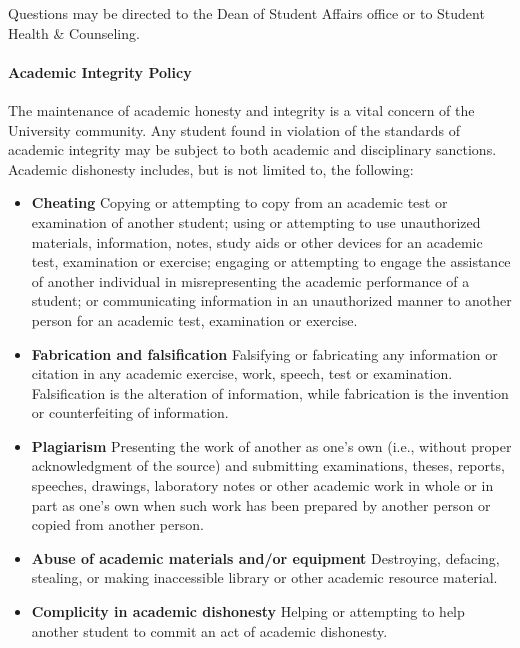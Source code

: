 \documentclass[12pt]{article}
\newcounter{ex}\setcounter{ex}{0}
\begin{document}
Questions may be directed to the Dean of Student Affairs office or to Student 
Health \& Counseling.


\paragraph{Academic Integrity Policy}

The maintenance of academic honesty and integrity is a vital concern 
of the University community. Any student found in violation of the 
standards of academic integrity may be subject to both academic and 
disciplinary sanctions. Academic dishonesty includes, but is not 
limited to, the following:

\begin{itemize}
    \item \textbf{Cheating} Copying or attempting to copy from an academic 
    test or examination of another student; using or attempting to 
    use unauthorized materials, information, notes, study aids or 
    other devices for an academic test, examination or exercise; 
    engaging or attempting to engage the assistance of another 
    individual in misrepresenting the academic performance of a 
    student; or communicating information in an unauthorized manner 
    to another person for an academic test, examination or exercise.
    
    \item \textbf{Fabrication and falsification} Falsifying or 
    fabricating any information or citation in any academic exercise, 
    work, speech, test or examination. Falsification is the 
    alteration of information, while fabrication is the invention 
    or counterfeiting of information.

    \item \textbf{Plagiarism}  Presenting the work of another as one's 
    own (i.e., without proper acknowledgment of the source) and 
    submitting examinations, theses, reports, speeches, drawings, 
    laboratory notes or other academic work in whole or in part as 
    one's own when such work has been prepared by another person or 
    copied from another person.

    \item \textbf{Abuse of academic materials and/or equipment} 
    Destroying, defacing, stealing, or making inaccessible library 
    or other academic resource material.

    \item \textbf{Complicity in academic dishonesty} Helping or 
    attempting to help another student to commit an act of academic 
    dishonesty.


\end{itemize}
\end{document}
